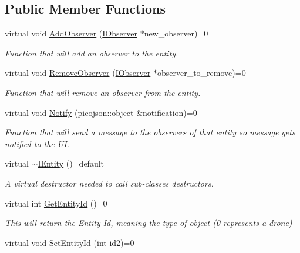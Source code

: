 \subsection*{Public Member Functions}
\begin{DoxyCompactItemize}
\item 
virtual void \hyperlink{classIEntity_a0d682e3663a78b6b5fd3df8cd51aa321}{Add\+Observer} (\hyperlink{classIObserver}{I\+Observer} $\ast$new\+\_\+observer)=0
\begin{DoxyCompactList}\small\item\em Function that will add an observer to the entity. \end{DoxyCompactList}\item 
virtual void \hyperlink{classIEntity_a651f1ca9f1e494af74e3f580b1c118d6}{Remove\+Observer} (\hyperlink{classIObserver}{I\+Observer} $\ast$observer\+\_\+to\+\_\+remove)=0
\begin{DoxyCompactList}\small\item\em Function that will remove an observer from the entity. \end{DoxyCompactList}\item 
virtual void \hyperlink{classIEntity_acd19cac6fe0e65495f80d1962320e0c3}{Notify} (picojson\+::object \&notification)=0
\begin{DoxyCompactList}\small\item\em Function that will send a message to the observers of that entity so message gets notified to the UI. \end{DoxyCompactList}\item 
\mbox{\label{classIEntity_a727892234e0efad23c7a399997dee974}} 
virtual \hyperlink{classIEntity_a727892234e0efad23c7a399997dee974}{$\sim$\+I\+Entity} ()=default
\begin{DoxyCompactList}\small\item\em A virtual destructor needed to call sub-\/classes destructors. \end{DoxyCompactList}\item 
virtual int \hyperlink{classIEntity_a4359ee47413fa0b2940b3b0336e13861}{Get\+Entity\+Id} ()=0
\begin{DoxyCompactList}\small\item\em This will return the \hyperlink{classEntity}{Entity} Id, meaning the type of object (0 represents a drone) \end{DoxyCompactList}\item 
virtual void \hyperlink{classIEntity_a3a830862181cb0548d2aca83d908263e}{Set\+Entity\+Id} (int id2)=0

\end{DoxyCompactItemize}
